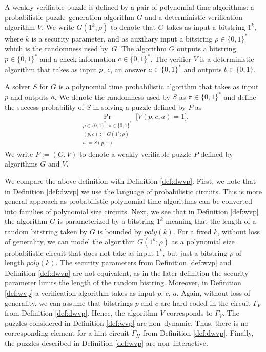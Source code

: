 \begin{definition}
  \label{def:wvp}
A \textnormal{weakly verifiable puzzle} is defined by a pair of polynomial time algorithms:
a probabilistic puzzle--generation algorithm $G$ and a deterministic verification algorithm $V$.
We write $G(1^k; \rho)$ to denote that $G$ takes as input a bitstring $1^k$, where $k$ is a security parameter,
and as auxiliary input a bitstring $\rho \in \{0,1\}^{*}$ which is the randomness used by~$G$.
The algorithm $G$ outputs a bitstring $p \in \{0,1\}^{*}$ and a check information $c \in \{0,1\}^{*}$.
The \textnormal{verifier} $V$ is a deterministic algorithm that takes as input $p$, $c$, an answer $a \in \{0,1\}^{*}$
and outputs $b \in \{0,1\}$.

A \textnormal{solver} $S$ for $G$ is a polynomial time probabilistic algorithm that
takes as input $p$ and outputs $a$. We denote the randomness used by $S$ as $\pi \in \{0,1\}^{*}$
and define the \textnormal{success probability} of $S$ in solving a puzzle defined by $P$ as
\begin{align*}
  \underset{\substack{\rho \in \{0,1\}^{*}, \pi \in \{0,1\}^{*} \\ (p,c):=G(1^k; \rho) \\ a := S(p, \pi)}}{\Pr}\Big[ V(p,c,a) = 1\Big].
\end{align*}
We write $P := (G,V)$ to denote a weakly verifiable puzzle $P$ defined by algorithms $G$ and $V$.
\end{definition}
We compare the above definition with Definition \ref{def:dwvp}.
First, we note that in Definition \ref{def:dwvp} we use the language of probabilistic circuits. This is more general approach
as probabilistic polynomial time algorithms can be converted into families of polynomial size circuits.
Next, we see that in Definition \ref{def:wvp} the algorithm $G$ is parameterized by
a bitstring $1^k$ meaning that the length of a random bitstring taken by $G$ is bounded by $poly(k)$.
For a fixed $k$, without loss of generality, we can model the algorithm $G(1^k; \rho)$ as a polynomial size probabilistic circuit
that does not take as input $1^k$, but just a bitstring $\rho$ of length $\mathit{poly}(k)$.
The security parameters from Definition \ref{def:wvp} and Definition \ref{def:dwvp} are not equivalent,
as in the later definition the security parameter limits the length of the random bistring.
Moreover, in Definition \ref{def:wvp} a verification algorithm takes as input $p$, $c$, $a$.
Again, without loss of generality, we can assume that bitstrings $p$ and $c$ are hard-coded
in the circuit $\Gamma_V$ from Definition \ref{def:dwvp}. Hence, the algorithm $V$ corresponds to $\Gamma_V$.
The puzzles considered in Definition \ref{def:wvp} are non--dynamic. Thus, there is no corresponding
element for a hint circuit $\Gamma_H$ from Definition \ref{def:dwvp}.
Finally, the puzzles described in Definition \ref{def:wvp} are non--interactive.

